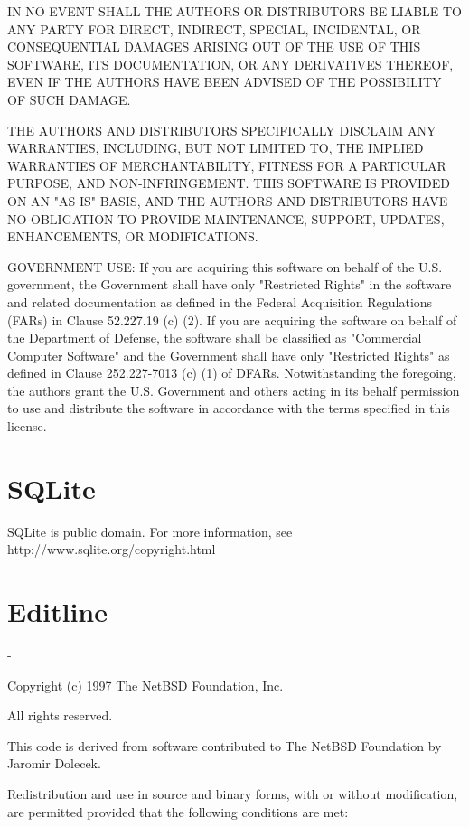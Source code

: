 \documentclass[twoside]{tceusermanual}
\begin{document}
IN NO EVENT SHALL THE AUTHORS OR DISTRIBUTORS BE LIABLE TO ANY PARTY FOR DIRECT, INDIRECT, SPECIAL, INCIDENTAL, OR CONSEQUENTIAL DAMAGES ARISING OUT OF THE USE OF THIS SOFTWARE, ITS DOCUMENTATION, OR ANY DERIVATIVES THEREOF, EVEN IF THE AUTHORS HAVE BEEN ADVISED OF THE POSSIBILITY OF SUCH DAMAGE.

THE AUTHORS AND DISTRIBUTORS SPECIFICALLY DISCLAIM ANY WARRANTIES, INCLUDING, BUT NOT LIMITED TO, THE IMPLIED WARRANTIES OF MERCHANTABILITY, FITNESS FOR A PARTICULAR PURPOSE, AND NON-INFRINGEMENT. THIS SOFTWARE IS PROVIDED ON AN "AS IS" BASIS, AND THE AUTHORS AND DISTRIBUTORS HAVE NO OBLIGATION TO PROVIDE MAINTENANCE, SUPPORT, UPDATES, ENHANCEMENTS, OR MODIFICATIONS.

GOVERNMENT USE: If you are acquiring this software on behalf of the U.S. government, the Government shall have only "Restricted Rights" in the software and related documentation as defined in the Federal Acquisition Regulations (FARs) in Clause 52.227.19 (c) (2). If you are acquiring the software on behalf of the Department of Defense, the software shall be classified as "Commercial Computer Software" and the Government shall have only "Restricted Rights" as defined in Clause 252.227-7013 (c) (1) of DFARs. Notwithstanding the foregoing, the authors grant the U.S. Government and others acting in its behalf permission to use and distribute the software in accordance with the terms specified in this license.

\section{SQLite}

SQLite is public domain. For more information, see http://www.sqlite.org/copyright.html

\section{Editline}

   -

   Copyright (c) 1997 The NetBSD Foundation, Inc.

   All rights reserved.
  
   This code is derived from software contributed to The NetBSD Foundation
   by Jaromir Dolecek.
  
   Redistribution and use in source and binary forms, with or without
   modification, are permitted provided that the following conditions
   are met:
\end{document}
